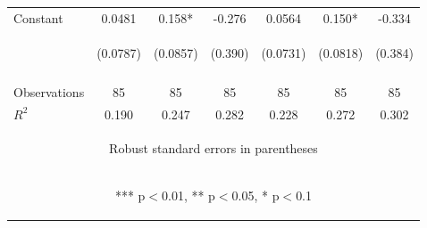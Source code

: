 \begin{center}
\begin{tabular}{lcccccc}
Constant & 0.0481 & 0.158* & -0.276 & 0.0564 & 0.150* & -0.334 \\
 & \begin{footnotesize}(0.0787)\end{footnotesize} & \begin{footnotesize}(0.0857)\end{footnotesize} & \begin{footnotesize}(0.390)\end{footnotesize} & \begin{footnotesize}(0.0731)\end{footnotesize} & \begin{footnotesize}(0.0818)\end{footnotesize} & \begin{footnotesize}(0.384)\end{footnotesize} \\
\vspace{4pt} & \begin{footnotesize}\end{footnotesize} & \begin{footnotesize}\end{footnotesize} & \begin{footnotesize}\end{footnotesize} & \begin{footnotesize}\end{footnotesize} & \begin{footnotesize}\end{footnotesize} & \begin{footnotesize}\end{footnotesize} \\
Observations & 85 & 85 & 85 & 85 & 85 & 85 \\
 $R^2$ & 0.190 & 0.247 & 0.282 & 0.228 & 0.272 & 0.302 \\ \hline
\multicolumn{7}{c}{\begin{footnotesize} Robust standard errors in parentheses\end{footnotesize}} \\
\multicolumn{7}{c}{\begin{footnotesize} *** p$<$0.01, ** p$<$0.05, * p$<$0.1\end{footnotesize}} \\
\end{tabular}
\end{center}
